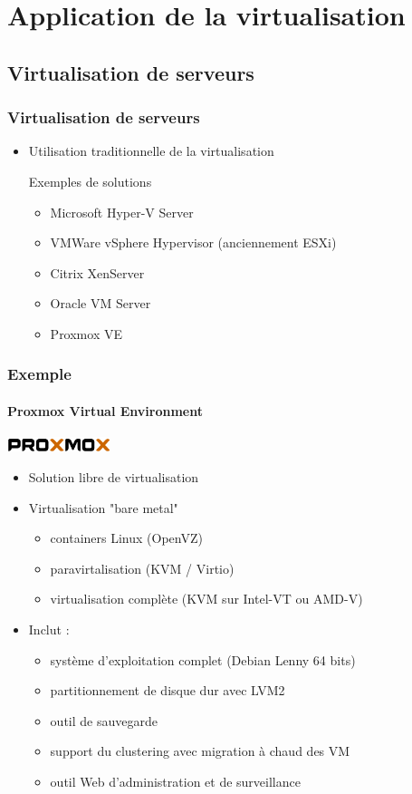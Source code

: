\section{Application de la virtualisation}

\subsection{Virtualisation de serveurs}

\begin{frame}
\frametitle{Virtualisation de serveurs}
\begin{itemize}
\item Utilisation traditionnelle de la virtualisation
\begin{exampleblock}{Exemples de solutions}
\begin{itemize}
\item Microsoft Hyper-V Server
\item VMWare vSphere Hypervisor (anciennement ESXi)
\item Citrix XenServer
\item Oracle VM Server
\item Proxmox VE
\end{itemize}
\end{exampleblock}
\end{itemize}
\end{frame}

\begin{frame}
\frametitle{Exemple}
\framesubtitle{Proxmox Virtual Environment}
\includegraphics[width=3cm]{../illustration/proxmox_logo.png}
\begin{itemize}
\item Solution libre de virtualisation
\item Virtualisation "bare metal"
\begin{itemize}
\item containers Linux (OpenVZ)
\item paravirtalisation (KVM / Virtio)
\item virtualisation complète (KVM sur Intel-VT ou AMD-V)
\end{itemize}
\item Inclut :
\begin{itemize}
\item système d'exploitation complet (Debian Lenny 64 bits)
\item partitionnement de disque dur avec LVM2
\item outil de sauvegarde 
\item support du clustering avec migration à chaud des VM
\item outil Web d'administration et de surveillance
\end{itemize}
\end{itemize}
\end{frame}

